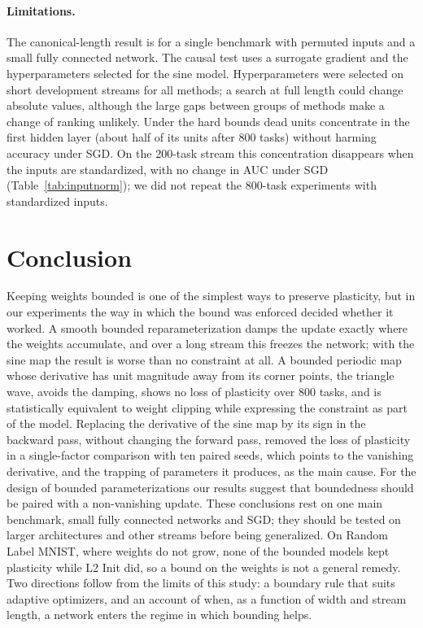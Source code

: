 \documentclass[11pt,a4paper]{article}
\begin{document}
\paragraph{Limitations.} The canonical-length result is for a single benchmark with permuted inputs and a small
fully connected network. The causal test uses a surrogate gradient and the hyperparameters selected for the sine model. Hyperparameters were
selected on short development streams for all methods; a search at full length could change absolute values,
although the large gaps between groups of methods make a change of ranking unlikely. Under the hard bounds
dead units concentrate in the first hidden layer (about half of its units after 800 tasks) without harming
accuracy under SGD. On the 200-task stream this concentration disappears when the inputs are standardized,
with no change in AUC under SGD (Table~\ref{tab:inputnorm}); we did not repeat the 800-task experiments with
standardized inputs.

\section{Conclusion}

Keeping weights bounded is one of the simplest ways to preserve plasticity, but in our experiments the way
in which the bound was enforced decided whether it worked. A smooth bounded reparameterization damps the update exactly where the weights
accumulate, and over a long stream this freezes the network; with the sine map the result is worse than no
constraint at all. A bounded periodic map whose derivative has unit magnitude away from its corner points, the triangle wave,
avoids the damping, shows no loss of plasticity over 800 tasks, and is statistically equivalent to weight clipping while
expressing the constraint as part of the model. Replacing the derivative of the sine map by its sign in the backward pass, without changing the forward
pass, removed the loss of plasticity in a single-factor comparison with ten paired seeds, which points to the vanishing derivative,
and the trapping of parameters it produces, as the main cause. For the design of
bounded parameterizations our results suggest that boundedness should be paired with a non-vanishing update.
These conclusions rest on one main benchmark, small fully connected networks and SGD; they should be tested
on larger architectures and other streams before being generalized. On Random Label MNIST, where weights do
not grow, none of the bounded models kept plasticity while L2 Init did, so a bound on the weights is not a
general remedy.
Two directions follow from the limits of this study: a boundary rule that suits adaptive optimizers, and an
account of when, as a function of width and stream length, a network enters the regime in which bounding helps.
\end{document}
